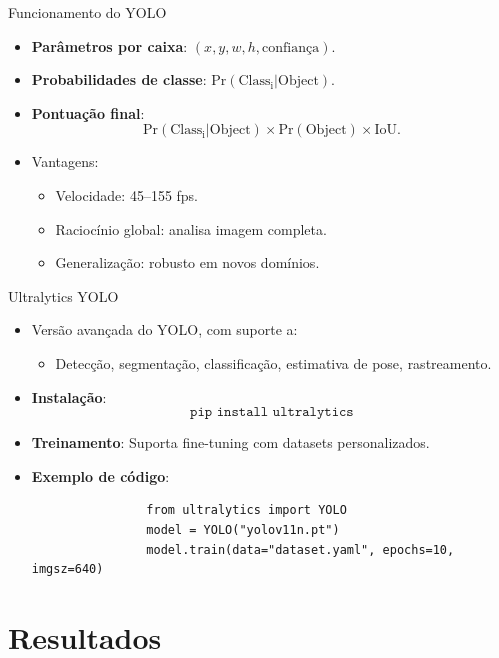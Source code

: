\documentclass{if-beamer}
\begin{document}
	\begin{frame}{Funcionamento do YOLO}
		\begin{itemize}
			\item \textbf{Parâmetros por caixa}: $(x, y, w, h, \text{confiança})$.
			\item \textbf{Probabilidades de classe}: $\mathrm{Pr(Class_i | Object)}$.
			\item \textbf{Pontuação final}: 
			\[
			\mathrm{Pr(Class_i | Object)} \times \mathrm{Pr(Object)} \times \text{IoU}.
			\]
			\item Vantagens:
			\begin{itemize}
				\item Velocidade: 45–155 fps.
				\item Raciocínio global: analisa imagem completa.
				\item Generalização: robusto em novos domínios.
			\end{itemize}
		\end{itemize}
	\end{frame}
	
	\begin{frame}[fragile]{Ultralytics YOLO}
		\begin{itemize}
			\item Versão avançada do YOLO, com suporte a:
			\begin{itemize}
				\item Detecção, segmentação, classificação, estimativa de pose, rastreamento.
			\end{itemize}
			\item \textbf{Instalação}: 
			\[
			\texttt{pip install ultralytics}
			\]
			\item \textbf{Treinamento}: Suporta fine-tuning com datasets personalizados.
			\item \textbf{Exemplo de código}:
			\begin{verbatim}
				from ultralytics import YOLO
				model = YOLO("yolov11n.pt")
				model.train(data="dataset.yaml", epochs=10, imgsz=640)
			\end{verbatim}
		\end{itemize}
	\end{frame}
	
	\section{Resultados}
	
\end{document}
